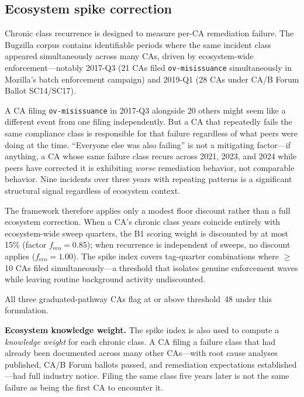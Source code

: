 \documentclass[10pt,twocolumn,letterpaper]{article}
\begin{document}
\subsection{Ecosystem spike correction}
\label{sec:ecosystem}

Chronic class recurrence is designed to measure per-CA remediation failure. The
Bugzilla corpus contains identifiable periods where the same incident class appeared
simultaneously across many CAs, driven by ecosystem-wide enforcement---notably
2017-Q3 (21 CAs filed \texttt{ov-misissuance} simultaneously in Mozilla's batch
enforcement campaign) and 2019-Q1 (28 CAs under CA/B Forum Ballot SC14/SC17).

A CA filing \texttt{ov-misissuance} in 2017-Q3 alongside 20 others might seem like
a different event from one filing independently. But a CA that repeatedly fails the
same compliance class is responsible for that failure regardless of what peers were
doing at the time. ``Everyone else was also failing'' is not a mitigating factor---if
anything, a CA whose same failure class recurs across 2021, 2023, and 2024 while
peers have corrected it is exhibiting \textit{worse} remediation behavior, not
comparable behavior. Nine incidents over three years with repeating patterns is a
significant structural signal regardless of ecosystem context.

The framework therefore applies only a modest floor discount rather than a full
ecosystem correction. When a CA's chronic class years coincide entirely with
ecosystem-wide sweep quarters, the B1 scoring weight is discounted by at most 15\%
(factor $f_\text{eco} = 0.85$); when recurrence is independent of sweeps, no
discount applies ($f_\text{eco} = 1.00$). The spike index covers tag-quarter
combinations where $\geq$10 CAs filed simultaneously---a threshold that isolates
genuine enforcement waves while leaving routine background activity undiscounted.

All three graduated-pathway CAs flag at or above threshold~48 under this
formulation.

\textbf{Ecosystem knowledge weight.} The spike index is also used to compute a
\textit{knowledge weight} for each chronic class. A CA filing a failure class that
had already been documented across many other CAs---with root cause analyses published,
CA/B Forum ballots passed, and remediation expectations established---had full industry
notice. Filing the same class five years later is not the same failure as being the
first CA to encounter it.
\end{document}
